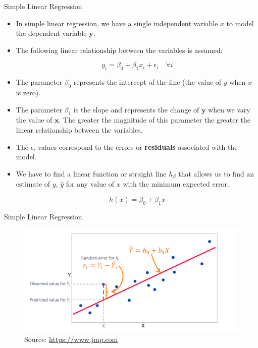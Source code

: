 \documentclass[handout]{beamer}
\begin{document}
\begin{frame}{Simple Linear Regression}
\scriptsize{
\begin{itemize}
 \item In simple linear regression, we have a single independent variable $x$ to model the dependent variable $\mathbf{y}$.

 \item The following linear relationship between the variables is assumed:

\begin{displaymath}
 y_i=\beta_{0}+\beta_{1}x_i +\epsilon_i \quad \forall i
\end{displaymath}

\item The parameter $\beta_{0}$ represents the intercept of the line (the value of $y$ when $x$ is zero).  

\item The parameter $\beta_{1}$ is the slope and represents the change of $\mathbf{y}$ when we vary the value of $\mathbf{x}$. The greater the magnitude of this parameter the greater the linear relationship between the variables.

\item The $\epsilon_{i}$ values correspond to the errors or \textbf{residuals} associated with the model.

\item We have to find a linear function or straight line $h_\beta$ that allows us to find an estimate of $y$, $\hat{y}$ for any value of $x$ with the minimum expected error.

\begin{displaymath}
h(x)=\beta_{0}+\beta_{1}x 
\end{displaymath}


\end{itemize}


} 
 
\end{frame}



\begin{frame}{Simple Linear Regression}
\scriptsize{

\begin{figure}[h!]
	\centering
	\includegraphics[scale=0.21]{pics/linear_model.png}
	\caption{Source: \url{https://www.jmp.com}}
\end{figure}

} 
 
\end{frame}
\end{document}
